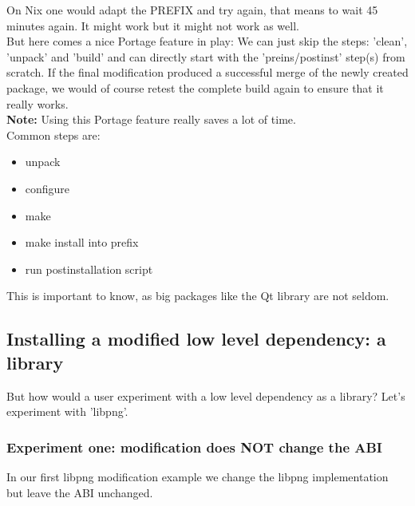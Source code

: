 \documentclass[a4paper,10pt]{article}
\begin{document}
On Nix one would adapt the PREFIX and try again, that means to wait 45 minutes again. It might work but it might not work as well. \\

But here comes a nice Portage feature in play: We can just skip the steps: 'clean', 'unpack' and 'build' and can directly start with the 'preins/postinst' step(s) from scratch. If the final modification produced a successful merge of the newly created package, we would of course retest the complete build again to ensure that it really works. \\

\textbf{Note:} Using this Portage feature really saves a lot of time. \\

Common steps are:
\begin{itemize}
\item unpack
\item configure
\item make
\item make install into prefix
\item run postinstallation script
\end{itemize}
This is important to know, as big packages like the Qt library are not seldom.












\newpage
\subsection{Installing a modified low level dependency: a library}
\label{experimentinstallingamodifiedlowleveldependency}
But how would a user experiment with a low level dependency as a library? Let's experiment with 'libpng'. 

\subsubsection{Experiment one: modification does NOT change the ABI}
\label{experimentone}
In our first libpng modification example we change the libpng implementation but leave the ABI unchanged.

\end{document}
